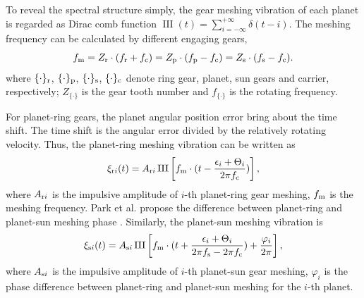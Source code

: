 \documentclass[a4paper,fleqn]{cas-sc}%
\begin{document}
\par To reveal the spectral structure simply, the gear meshing vibration of each planet is regarded as Dirac comb function $\operatorname{III}(t)=\sum_{i=-\infty}^{+\infty}\delta(t-i)$. The meshing frequency can be calculated by different engaging gears,
\begin{equation}
    f_{\rm m}=Z_{\rm r} \cdot (f_{\rm r}+f_{\rm c})=Z_{\rm p} \cdot (f_{\rm p}-f_{\rm c})=Z_{\rm s} \cdot (f_{\rm s}-f_{\rm c}). \label{eq:meshing_frequency}
\end{equation}
where $\{\cdot\}_{\rm r}$, $\{\cdot\}_{\rm p}$, $\{\cdot\}_{\rm s}$, $\{\cdot\}_{\rm c}$ denote ring gear, planet, sun gears and carrier, respectively; $Z_{\{\cdot\}}$ is the gear tooth number and $f_{\{\cdot\}}$ is the rotating frequency. 
\par For planet-ring gears, the planet angular position error bring about the time shift. The time shift is the angular error divided by the relatively rotating velocity. Thus, the planet-ring meshing vibration can be written as
\begin{equation}
    \xi_{{\rm r}i}(t)=A_{{\rm r}i}\operatorname{III}\left[f_{\rm m} \cdot (t-\frac{\epsilon_i+\Theta_i}{2 \pi f_{\rm c}})\right],\label{eq:planet-ring_meshing}
\end{equation}
where $A_{{\rm r}i}$ is the impulsive amplitude of $i$-th planet-ring gear meshing, $f_{\rm m}$ is the meshing frequency. Park et al. propose the difference between planet-ring and planet-sun meshing phase \cite{Parker2004}. Similarly, the planet-sun meshing vibration is
\begin{equation}
    \xi_{{\rm s}i}(t)=A_{{\rm s}i} \operatorname{III}\left[f_{\rm m} \cdot (t + \frac{\epsilon_i+\Theta_i}{2 \pi f_{\rm s}- 2 \pi f_{\rm c}})+ \frac{\varphi_i}{2 \pi} \right],\label{eq:planet-sun_meshing}
\end{equation}
where $A_{{\rm s}i}$ is the impulsive amplitude of $i$-th planet-sun gear meshing, $\varphi_i$ is the phase difference between planet-ring and planet-sun meshing for the $i$-th planet.
\end{document}
